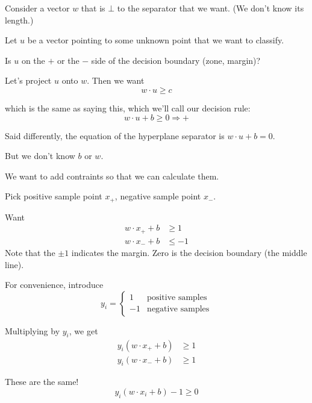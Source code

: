 \bigskip
\centerline{}
\bigskip

Consider a vector $w$ that is $\bot$ to the separator that we want.
(We don't know its length.)

Let $u$ be a vector pointing to some unknown point that we want to
classify.

Is $u$ on the $+$ or the $-$ side of the decision boundary (zone, margin)?

Let's project $u$ onto $w$.  Then we want
\begin{displaymath}
  w\cdot u \ge c
\end{displaymath}

which is the same as saying this, which we'll call our decision rule:
\begin{equation}
  \label{eq:decision-rule}
  \boxed{w\cdot u + b \ge 0 \Rightarrow +}
\end{equation}

Said differently, the equation of the hyperplane separator is
$w\cdot u + b = 0$.

But we don't know $b$ or $w$.

We want to add contraints so that we can calculate them.

Pick positive sample point $x_+$, negative sample point $x_-$.

Want
\begin{align*}
  w\cdot x_+ + b & \ge 1
  \\
  w\cdot x_- + b & \le -1
\end{align*}
Note that the $\pm 1$ indicates the margin.  Zero is the decision
boundary (the middle line).

For convenience, introduce
\begin{equation*}
  y_i =
  \begin{cases}
    1 & \mbox{positive samples} \\
    -1 & \mbox{negative samples}
  \end{cases}
\end{equation*}

Multiplying by $y_i$, we get
\begin{align*}
  y_i(w\cdot x_+ + b) & \ge 1
  \\
  y_i(w\cdot x_- + b) & \ge 1
\end{align*}

These are the same!
\begin{displaymath}
  y_i(w\cdot x_i + b) - 1 \ge 0
\end{displaymath}

